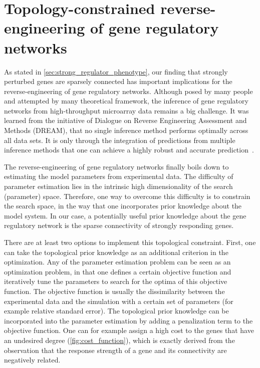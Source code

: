 \section{Topology-constrained reverse-engineering of gene regulatory networks}
As stated in \ref{sec:strong_regulator_phenotype}, our finding that strongly perturbed 
genes are sparsely connected has important implications for the reverse-engineering
of gene regulatory networks. Although posed by many people and attempted by 
many theoretical framework, the inference of gene regulatory networks from 
high-throughput microarray data remains a big challenge. It was learned from
the initiative of Dialogue on Reverse Engineering Assessment and Methods (DREAM),
that no single inference method performs optimally across all data sets. 
It is only through the integration of predictions from multiple inference methods 
that one can achieve a highly robust and accurate prediction~\citep{Marbach2012}.

The reverse-engineering of gene regulatory networks finally boils down to 
estimating the model parameters from experimental data. The difficulty of
parameter estimation lies in the intrinsic high dimensionality of the search
(parameter) space. Therefore, one way to overcome this difficulty is to 
constrain the search space, in the way that one incorporates prior knowledge
about the model system. In our case, a potentially useful prior knowledge
about the gene regulatory network is the sparse connectivity of strongly 
responding genes.

There are at least two options to implement this topological constraint. 
First, one can take the topological prior knowledge as an additional
criterion in the optimization. Any of the parameter estimation problem
can be seen as an optimization problem, in that one defines a certain
objective function and iteratively tune the parameters to search for
the optima of this objective function. The objective function is usually the 
dissimilarity between the experimental data and the simulation with a certain
set of parameters (for example
relative standard error). The topological prior knowledge can be incorporated
into the parameter estimation by adding a penalization term to the
objective function.
One can for example
assign a high cost to the genes that have an undesired degree (\ref{fig:cost_function}), 
which is exactly derived 
from the observation that the response strength of a gene and its connectivity
are negatively related.

